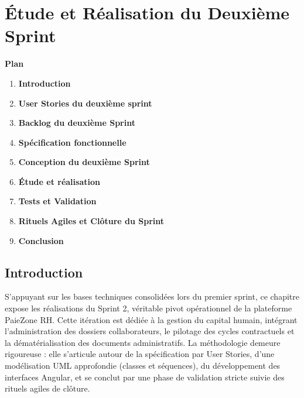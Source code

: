 \newpage
\chapter{Étude et Réalisation du Deuxième Sprint}
\vspace{2.5cm}

\noindent \textbf{\Large Plan}
\vspace{0.8cm}

\begin{enumerate}[label=\textbf{\arabic*}, leftmargin=1.5cm, labelsep=0.8cm]
    \item[] \hspace*{-1.5cm}\textbf{Introduction}                          \dotfill \pageref{sec:s2-intro}
    \item \textbf{User Stories du deuxième sprint}       \dotfill \pageref{sec:s2-userstories}
    \item \textbf{Backlog du deuxième Sprint}            \dotfill \pageref{sec:s2-backlog}
    \item \textbf{Spécification fonctionnelle}           \dotfill \pageref{sec:s2-specification}
    \item \textbf{Conception du deuxième Sprint}         \dotfill \pageref{sec:s2-conception}
    \item \textbf{Étude et réalisation}                  \dotfill \pageref{sec:s2-realisation}
    \item \textbf{Tests et Validation}                   \dotfill \pageref{sec:s2-tests}
    \item \textbf{Rituels Agiles et Clôture du Sprint}   \dotfill \pageref{sec:s2-rituels}
    \item[] \hspace*{-1.5cm}\textbf{Conclusion}                            \dotfill \pageref{sec:s2-conclusion}
\end{enumerate}

\vfill
\newpage

\section*{Introduction}
\label{sec:s2-intro}

S'appuyant sur les bases techniques consolidées lors du premier sprint, ce chapitre expose les réalisations du Sprint 2, véritable pivot opérationnel de la plateforme PaieZone RH. Cette itération est dédiée à la gestion du capital humain, intégrant l'administration des dossiers collaborateurs, le pilotage des cycles contractuels et la dématérialisation des documents administratifs. La méthodologie demeure rigoureuse : elle s'articule autour de la spécification par User Stories, d'une modélisation UML approfondie (classes et séquences), du développement des interfaces Angular, et se conclut par une phase de validation stricte suivie des rituels agiles de clôture.

